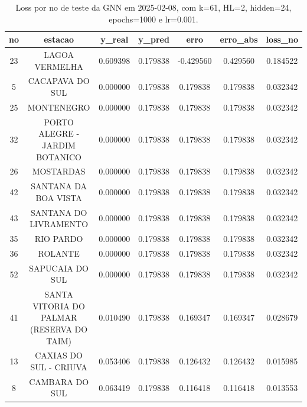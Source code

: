 \begin{table}[h]
\centering
\caption{Loss por no de teste da GNN em 2025-02-08, com k=61, HL=2, hidden=24, epochs=1000 e lr=0.001.}
\label{tab:gnn_loss_k61_hl2_h24_e1000_d20250208}
\begin{tabular}{ccccccc}
\toprule
no & estacao & y\_real & y\_pred & erro & erro\_abs & loss\_no \\
\midrule
23 & LAGOA VERMELHA & 0.609398 & 0.179838 & -0.429560 & 0.429560 & 0.184522 \\
5 & CACAPAVA DO SUL & 0.000000 & 0.179838 & 0.179838 & 0.179838 & 0.032342 \\
25 & MONTENEGRO & 0.000000 & 0.179838 & 0.179838 & 0.179838 & 0.032342 \\
32 & PORTO ALEGRE - JARDIM BOTANICO & 0.000000 & 0.179838 & 0.179838 & 0.179838 & 0.032342 \\
26 & MOSTARDAS & 0.000000 & 0.179838 & 0.179838 & 0.179838 & 0.032342 \\
42 & SANTANA DA BOA VISTA & 0.000000 & 0.179838 & 0.179838 & 0.179838 & 0.032342 \\
43 & SANTANA DO LIVRAMENTO & 0.000000 & 0.179838 & 0.179838 & 0.179838 & 0.032342 \\
35 & RIO PARDO & 0.000000 & 0.179838 & 0.179838 & 0.179838 & 0.032342 \\
36 & ROLANTE & 0.000000 & 0.179838 & 0.179838 & 0.179838 & 0.032342 \\
52 & SAPUCAIA DO SUL & 0.000000 & 0.179838 & 0.179838 & 0.179838 & 0.032342 \\
41 & SANTA VITORIA DO PALMAR (RESERVA DO TAIM) & 0.010490 & 0.179838 & 0.169347 & 0.169347 & 0.028679 \\
13 & CAXIAS DO SUL - CRIUVA & 0.053406 & 0.179838 & 0.126432 & 0.126432 & 0.015985 \\
8 & CAMBARA DO SUL & 0.063419 & 0.179838 & 0.116418 & 0.116418 & 0.013553 \\
\bottomrule
\end{tabular}
\end{table}
